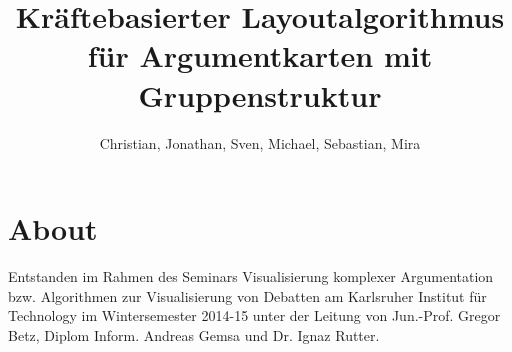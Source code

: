 \documentclass{algo-paper}
\title{Kräftebasierter Layoutalgorithmus für Argumentkarten mit Gruppenstruktur}
\subtitle{\vskip 2.5em Seminararbeit zur Veranstalltung Visualisierung komplexer Argumentation \vskip 1.5em}
\author{Christian, Jonathan, Sven, Michael, Sebastian, Mira}
\theoremstyle{changebreak}
\begin{document}
  


\cleardoublepage



\cleardoublepage

\tableofcontents
\cleardoublepage












\chapter*{About}
Entstanden im Rahmen des Seminars Visualisierung komplexer Argumentation bzw. Algorithmen zur Visualisierung von Debatten 
am Karlsruher Institut für Technology im Wintersemester 2014-15 unter der Leitung von 
Jun.-Prof. Gregor Betz, Diplom Inform. Andreas Gemsa und Dr. Ignaz Rutter.
\end{document}
